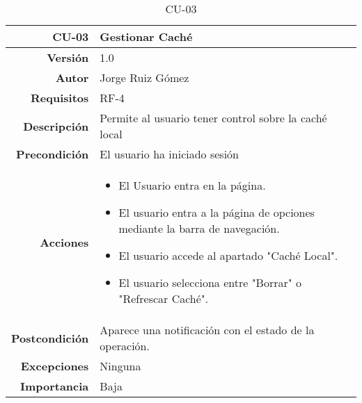 \begin{table}[]
\centering
\begin{tabular}{r|p{}}
\hline
\textbf{CU-03}         & \textbf{Gestionar Caché}                                 \\ \hline
\textbf{Versión}       & 1.0                                                     \\
\textbf{Autor}         & Jorge Ruiz Gómez                                        \\
\textbf{Requisitos}    & RF-4                                         \\
\textbf{Descripción}   & Permite al usuario tener control sobre la caché local \\ \hline
\textbf{Precondición}  & El usuario ha iniciado sesión                                                 \\
\textbf{Acciones}      &    \begin{itemize}
                                \item El Usuario entra en la página.
                                \item El usuario entra a la página de opciones mediante la barra de navegación.
                                \item El usuario accede al apartado "Caché Local".
                                \item El usuario selecciona entre "Borrar" o "Refrescar Caché". 
                            \end{itemize}\\
                                                                          
\textbf{Postcondición} & Aparece una notificación con el estado de la operación.\\
\textbf{Excepciones}   & Ninguna                                                 \\
\textbf{Importancia}   & Baja                                                    \\ \hline
\end{tabular}
\caption{CU-03}
\label{tab:my-table}
\end{table}



